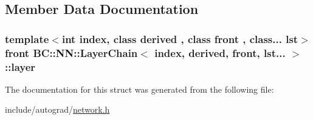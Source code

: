 \subsection{Member Data Documentation}
\subsubsection[{\texorpdfstring{layer}{layer}}]{\setlength{\rightskip}{0pt plus 5cm}template$<$int index, class derived , class front , class... lst$>$ front {\bf B\+C\+::\+N\+N\+::\+Layer\+Chain}$<$ index, derived, front, lst... $>$\+::layer}\hypertarget{structBC_1_1NN_1_1LayerChain_3_01index_00_01derived_00_01front_00_01lst_8_8_8_01_4_a293d83d632405821a92723ecd1443cde}{}\label{structBC_1_1NN_1_1LayerChain_3_01index_00_01derived_00_01front_00_01lst_8_8_8_01_4_a293d83d632405821a92723ecd1443cde}


The documentation for this struct was generated from the following file\+:\begin{DoxyCompactItemize}
\item 
include/autograd/\hyperlink{network_8h}{network.\+h}\end{DoxyCompactItemize}
